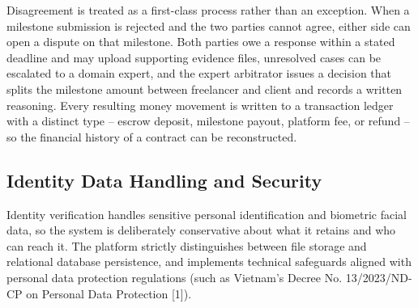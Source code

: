Disagreement is treated as a first-class process rather than an exception. When a milestone submission is rejected and the two parties cannot agree, either side can open a dispute on that milestone. Both parties owe a response within a stated deadline and may upload supporting evidence files, unresolved cases can be escalated to a domain expert, and the expert arbitrator issues a decision that splits the milestone amount between freelancer and client and records a written reasoning. Every resulting money movement is written to a transaction ledger with a distinct type -- escrow deposit, milestone payout, platform fee, or refund -- so the financial history of a contract can be reconstructed.

\subsection{Identity Data Handling and Security}

Identity verification handles sensitive personal identification and biometric facial data, so the system is deliberately conservative about what it retains and who can reach it. The platform strictly distinguishes between file storage and relational database persistence, and implements technical safeguards aligned with personal data protection regulations (such as Vietnam's Decree No. 13/2023/ND-CP on Personal Data Protection [1]).

